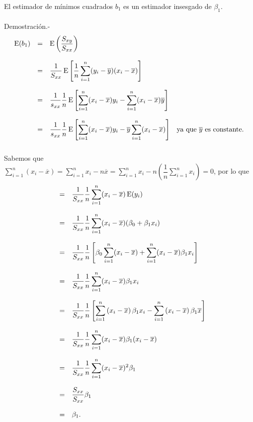 \begin{teo}
    El estimador de mínimos cuadrados $b_1$ es un estimador insesgado  de $\beta_1$.\\\\
	Demostración.-\;
	$$
	\begin{array}{rcll}
	    \mathop{\mbox{\normalfont E}}\nolimits(b_1) &=& \mathop{\mbox{\normalfont E}}\nolimits\left(\dfrac{S_{xy}}{S_{xx}}\right)&\\\\
		    &=& \dfrac{1}{S_{xx}} \mathop{\mbox{\normalfont E}}\nolimits\left[\dfrac{1}{n}\displaystyle\sum_{i=1}^n(y_i-\overline{y})(x_i-\overline{x})\right]&\\\\
		    &=& \dfrac{1}{s_{xx}}\dfrac{1}{n}\mathop{\mbox{\normalfont E}}\nolimits\left[\displaystyle\sum_{i=1}^n(x_i-\overline{x})y_i-\displaystyle\sum_{i=1}^n(x_i-\overline{x})\overline{y}\right]&\\\\
		    &=& \dfrac{1}{s_{xx}}\dfrac{1}{n}\mathop{\mbox{\normalfont E}}\nolimits\left[\displaystyle\sum_{i=1}^n(x_i-\overline{x})y_i-\overline{y}\displaystyle\sum_{i=1}^n(x_i-\overline{x})\right]&\mbox{ya que } \overline{y} \mbox{ es constante}.\\\\
	\end{array}
	$$
	Sabemos que $\sum\limits_{i=1}^n (x_i-\overline{x})=\sum\limits_{i=1}^n x_i - n\overline{x}=\sum\limits_{i=1}^n x_i-n\left(\dfrac{1}{n}\sum\limits_{i=1}^n x_i\right)=0$, por lo que
	$$
	\begin{array}{rcl}
		   &=& \dfrac{1}{S_{xx}}\dfrac{1}{n}\displaystyle\sum_{i=1}^n (x_i-\overline{x}) \mathop{\mbox{\normalfont E}}\nolimits(y_i)\\\\
		   &=& \dfrac{1}{S_{xx}}\dfrac{1}{n}\displaystyle\sum_{i=1}^n (x_i-\overline{x}) (\beta_0+\beta_1x_i)\\\\
		   &=& \dfrac{1}{S_{xx}}\dfrac{1}{n}\left[\beta_0\displaystyle\sum_{i=1}^n (x_i-\overline{x})  + \displaystyle\sum_{i=1}^n(x_i-\overline{x})\beta_1 x_i\right]\\\\
		   &=& \dfrac{1}{S_{xx}}\dfrac{1}{n}\displaystyle\sum_{i=1}^n (x_i-\overline{x})\beta_1x_i\\\\
		   &=& \dfrac{1}{S_{xx}}\dfrac{1}{n}\left[\displaystyle\sum_{i=1}^n\left(x_i-\overline{x}\right)\beta_1x_i-\displaystyle\sum_{i=1}^n\left(x_i-\overline{x}\right)\beta_1\overline{x}\right]\\\\
		   &=& \dfrac{1}{S_{xx}}\dfrac{1}{n}\displaystyle\sum_{i=1}^n (x_i-\overline{x})\beta_1(x_i-\overline{x})\\\\
		   &=& \dfrac{1}{S_{xx}}\dfrac{1}{n}\displaystyle\sum_{i=1}^n (x_i-\overline{x})^2\beta_1\\\\
		   &=& \dfrac{S_{xx}}{S_{xx}}\beta_1\\\\
		       &=&\beta_1.
	\end{array}
	$$
\end{teo}

